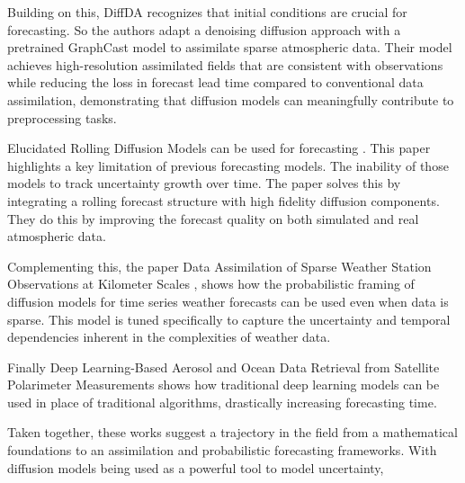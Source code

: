 \documentclass[12pt]{article}
\begin{document}
Building on this, DiffDA \cite{huang2024diffda} recognizes that initial conditions are crucial for forecasting. So the authors adapt a denoising diffusion approach with a pretrained GraphCast model to assimilate sparse atmospheric data. Their model achieves high-resolution assimilated fields that are consistent with observations while reducing the loss in forecast lead time compared to conventional data assimilation, demonstrating that diffusion models can meaningfully contribute to preprocessing tasks.

Elucidated Rolling Diffusion Models can be used for forecasting \cite{cachay2025elucidated}.  This paper highlights a key limitation of previous forecasting models.  The inability of those models to track uncertainty growth over time.  The paper solves this by integrating a rolling forecast structure with high fidelity diffusion components.  They do this by improving the forecast quality on both simulated and real atmospheric data.

Complementing this, the paper Data Assimilation of Sparse Weather Station Observations at Kilometer Scales \cite{manshausen2025generative}, shows how the probabilistic framing of diffusion models for time series weather forecasts can be used even when data is sparse.  This model is tuned specifically to capture the uncertainty and temporal dependencies inherent in the complexities of weather data.

Finally Deep Learning-Based Aerosol and Ocean Data Retrieval from Satellite Polarimeter Measurements \cite{wang2025deeplearning} shows how traditional deep learning models can be used in place of traditional algorithms, drastically increasing forecasting time.

Taken together, these works suggest a trajectory in the field from a mathematical foundations to an assimilation and probabilistic forecasting frameworks.  With diffusion models being used as a powerful tool to model uncertainty,


\end{document}
